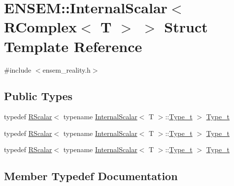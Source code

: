 \hypertarget{structENSEM_1_1InternalScalar_3_01RComplex_3_01T_01_4_01_4}{}\section{E\+N\+S\+EM\+:\+:Internal\+Scalar$<$ R\+Complex$<$ T $>$ $>$ Struct Template Reference}
\label{structENSEM_1_1InternalScalar_3_01RComplex_3_01T_01_4_01_4}


{\ttfamily \#include $<$ensem\+\_\+reality.\+h$>$}

\subsection*{Public Types}
\begin{DoxyCompactItemize}
\item 
typedef \mbox{\hyperlink{classENSEM_1_1RScalar}{R\+Scalar}}$<$ typename \mbox{\hyperlink{structENSEM_1_1InternalScalar}{Internal\+Scalar}}$<$ T $>$\+::\mbox{\hyperlink{structENSEM_1_1InternalScalar_3_01RComplex_3_01T_01_4_01_4_ae83e499664d5d34d7a1271f9151f4ab0}{Type\+\_\+t}} $>$ \mbox{\hyperlink{structENSEM_1_1InternalScalar_3_01RComplex_3_01T_01_4_01_4_ae83e499664d5d34d7a1271f9151f4ab0}{Type\+\_\+t}}
\item 
typedef \mbox{\hyperlink{classENSEM_1_1RScalar}{R\+Scalar}}$<$ typename \mbox{\hyperlink{structENSEM_1_1InternalScalar}{Internal\+Scalar}}$<$ T $>$\+::\mbox{\hyperlink{structENSEM_1_1InternalScalar_3_01RComplex_3_01T_01_4_01_4_ae83e499664d5d34d7a1271f9151f4ab0}{Type\+\_\+t}} $>$ \mbox{\hyperlink{structENSEM_1_1InternalScalar_3_01RComplex_3_01T_01_4_01_4_ae83e499664d5d34d7a1271f9151f4ab0}{Type\+\_\+t}}
\item 
typedef \mbox{\hyperlink{classENSEM_1_1RScalar}{R\+Scalar}}$<$ typename \mbox{\hyperlink{structENSEM_1_1InternalScalar}{Internal\+Scalar}}$<$ T $>$\+::\mbox{\hyperlink{structENSEM_1_1InternalScalar_3_01RComplex_3_01T_01_4_01_4_ae83e499664d5d34d7a1271f9151f4ab0}{Type\+\_\+t}} $>$ \mbox{\hyperlink{structENSEM_1_1InternalScalar_3_01RComplex_3_01T_01_4_01_4_ae83e499664d5d34d7a1271f9151f4ab0}{Type\+\_\+t}}
\end{DoxyCompactItemize}


\subsection{Member Typedef Documentation}
\mbox{\label{structENSEM_1_1InternalScalar_3_01RComplex_3_01T_01_4_01_4_ae83e499664d5d34d7a1271f9151f4ab0}} 
